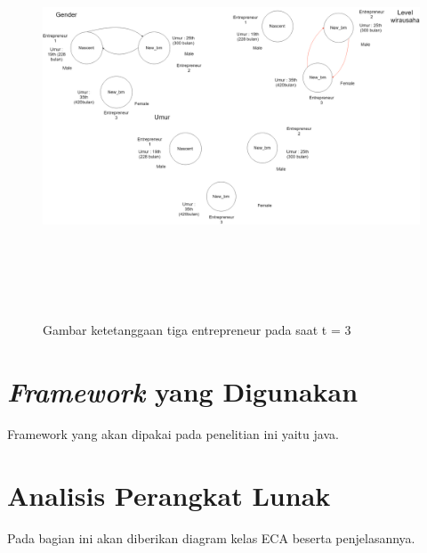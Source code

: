 	\begin{figure} [H]
		\centering  
		\includegraphics[width=18cm, height=12cm]{gambarwirausaha(t=3)} 
		\caption[Gambar ketetanggaan tiga entrepreneur pada saat t = 3]{Gambar ketetanggaan tiga entrepreneur pada saat t = 3} 
		\label{fig:t0} 
	\end{figure}


\section{\textit{Framework} yang Digunakan}
\label{framework}
Framework yang akan dipakai pada penelitian ini yaitu java.
	
	
\section{Analisis Perangkat Lunak}
\label{analisisPL}
Pada bagian ini akan diberikan diagram kelas ECA beserta penjelasannya.

